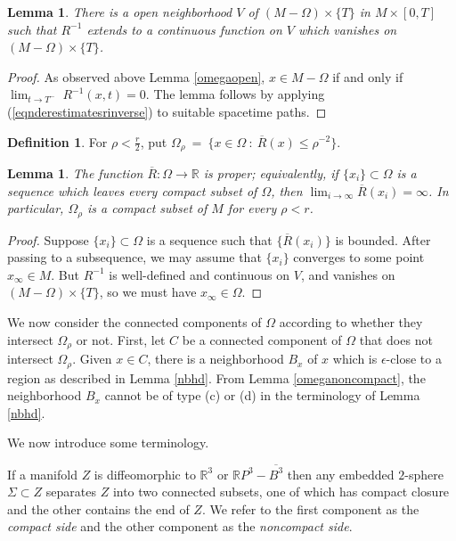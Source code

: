 \documentclass[12pt]{amsart}
\newcommand{\R}{{\mathbb R}}
\newcommand{\ol}{\overline}
\newcommand{\ra}{\rightarrow}
\newcommand{\Si}{\Sigma}
\numberwithin{equation}{section}
\theoremstyle{plain}
\newtheorem{lemma}[equation]{Lemma}
\theoremstyle{definition}
\newtheorem{definition}[equation]{Definition}
\theoremstyle{remark}
\begin{document}
\begin{lemma}
\label{lemrinverseextends}
There is a open neighborhood $V$ of $(M-\Omega)\times\{T\}$
in $M\times [0,T]$ such that $R^{-1}$  extends to a 
continuous function on $V$ which vanishes on $(M-\Omega)\times\{T\}$.
\end{lemma}
\begin{proof}
As observed above Lemma \ref{omegaopen}, $x\in M-\Omega$ if and only if
$\lim_{t\ra T^-}\;R^{-1}(x,t)=0$. The lemma follows by applying
(\ref{eqnderestimatesrinverse}) to suitable spacetime paths.
\end{proof}


\begin{definition}
For 
$\rho < \frac{r}{2}$,
put $\Omega_\rho \: = \: \{x \in \Omega \: : \:
\overline{R}(x) \le \rho^{-2} \}$.
\end{definition}

\begin{lemma}
\label{lemoverlinerisproper}
The function $\overline{R}:\Omega\ra \R$ is proper; equivalently,
if $\{x_i\}\subset \Omega$ is a sequence which leaves every compact
subset of $\Omega$, then $\lim_{i \rightarrow \infty} \overline{R}(x_i) = \infty$.
In particular, 
$\Omega_\rho$ is a compact subset of $M$ for every $\rho<r$.
\end{lemma}
\begin{proof}
Suppose $\{x_i\}\subset \Omega$ is a sequence such that
$\{\overline{R}(x_i)\}$ is bounded.  After passing to a subsequence,
we may assume that $\{x_i\}$ converges to some point $x_\infty\in M$.
But $R^{-1}$ is well-defined and continuous on $V$, and vanishes on 
$(M-\Omega)\times\{T\}$, so we must have $x_\infty\in \Omega$.
\end{proof}

We now consider the connected components of $\Omega$ according to whether
they intersect $\Omega_\rho$ or not. First, let $C$ be a connected component of
$\Omega$ that does not intersect $\Omega_\rho$.
Given $x \in C$, there is a neighborhood $B_x$ of $x$ which is $\epsilon$-close 
to a region as described in Lemma \ref{nbhd}.
From Lemma \ref{omeganoncompact}, the neighborhood $B_x$ cannot be of
type (c) or (d) in the terminology of Lemma \ref{nbhd}.

We now introduce some terminology.

If a manifold $Z$ is diffeomorphic to $\R^3$ or $\R P^3-\ol{B^3}$ 
then any embedded $2$-sphere
$\Si\subset Z$ separates $Z$ into two connected subsets, one
of which has compact closure and the other contains the end
of $Z$. We refer to the first component as the {\em compact
side} and the other component as the {\em noncompact side}.
\end{document}
